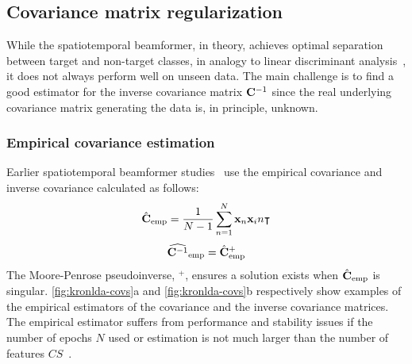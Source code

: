 	\subsection{Covariance matrix regularization}
	While the spatiotemporal beamformer, in theory, achieves optimal separation
	between target and non-target classes, in analogy to linear discriminant
  analysis~\cite{Treder2016}, it does not always perform well on unseen data.
	The main challenge is to find a good estimator for the inverse covariance
  matrix $\mathbf{C}^{-1}$ since the real underlying covariance matrix generating the data is, in principle, unknown.

	\subsubsection{Empirical covariance estimation}
	\label{sec:stbf-struct/methods/emp-cov}
	Earlier spatiotemporal beamformer studies~\cite{Wittevrongel2016,
		Wittevrongel2016a, Wittevrongel2017, Wittevrongel2017a} use the empirical
	covariance and inverse covariance calculated as follows:
	\begin{equation}
    \hat{\mathbf{C}}_\text{emp} =
		\frac{1}{N-1}\sum^{N}_{n=1}\mathbf{x}_n\mathbf{x}_in\intercal
		\label{eq:stbf-struct/emp-cov}
	\end{equation}
	\begin{equation}
    \widehat{\mathbf{C}^{-1}}_\text{emp} = \hat{\mathbf{C}}_\text{emp}^+
		\label{eq:stbf-struct/emp-inv-cov}
	\end{equation}
	The Moore-Penrose pseudoinverse, $^+$, ensures a solution exists when
  $\hat{\mathbf{C}}_\text{emp}$ is singular.
	\cref{fig:kronlda-covs}a and \cref{fig:kronlda-covs}b respectively show examples of the
	empirical estimators of the covariance and the inverse covariance matrices.
	The empirical estimator suffers from performance and
	stability issues if the number of epochs $N$ used or estimation is not much larger than the number of features $CS$~\cite{Stein1956,Khatri1987}.

